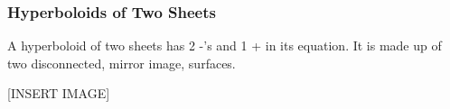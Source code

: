 \subsubsection{Hyperboloids of Two Sheets}
\noindent
A hyperboloid of two sheets has 2 -'s and 1 + in its equation. It is made up of two disconnected, mirror image, surfaces.

[INSERT IMAGE]